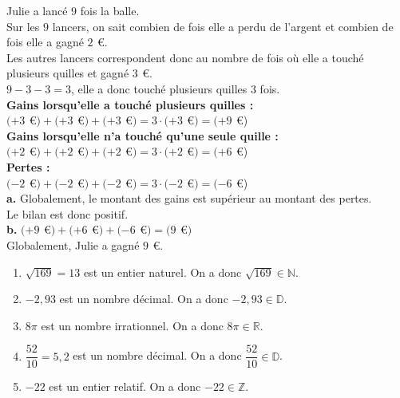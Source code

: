 \documentclass[a4paper,12pt]{report}
\begin{document}
\begin{Correction}
\begin{EXO}{}{}
 
Julie a lancé $9$ fois la balle.\\
Sur les $9$ lancers, on sait combien de fois elle a perdu de l'argent et combien de fois elle a gagné $2~$\,\euro{}.\\
Les autres lancers correspondent donc au nombre de fois où elle a touché plusieurs quilles et gagné $3~$\,\euro{}.\\
$9-3-3 = 3$,
elle a donc touché plusieurs quilles $3$ fois.\\
\textbf{Gains lorsqu'elle a touché plusieurs quilles :}\\
$(+3~$\,\euro{}$)+(+3~$\,\euro{}$)+(+3~$\,\euro{}$) = 3\cdot (+3~$\,\euro{}$) = (+9~$\,\euro{})\\
\textbf{Gains lorsqu'elle n'a touché qu'une seule quille :}\\
$(+2~$\,\euro{}$)+(+2~$\,\euro{}$)+(+2~$\,\euro{}$) = 3\cdot (+2~$\,\euro{}$) = (+6~$\,\euro{})\\
\textbf{Pertes :}\\
$(-2~$\,\euro{}$)+(-2~$\,\euro{}$)+(-2~$\,\euro{}$) = 3\cdot (-2~$\,\euro{}$) = (-6~$\,\euro{})\\
\textbf {a.}  Globalement, le montant des gains est supérieur au montant des pertes.\\ 
{\color[HTML]{f15929}Le bilan est donc positif.}\\
\textbf {b.} 
$(+9~$\,\euro{}$)+(+6~$\,\euro{}$)+(-6~$\,\euro{}$) = (9~$\,\euro{}$)$\\
{\color[HTML]{f15929}Globalement, Julie a gagné $9~$\,\euro{}.}

\end{EXO}

\begin{EXO}{}{}
\begin{multicols}{2}

\begin{enumerate}[]
\item \begin{minipage}[t]{\linewidth}$\sqrt{169}=13$  est un entier naturel. On a donc $\sqrt{169}\in \mathbb{N}$.\end{minipage}
\item \begin{minipage}[t]{\linewidth}$-2{,}93$ est un nombre décimal. On a donc $-2{,}93\in \mathbb{D}$.\end{minipage}
\item \begin{minipage}[t]{\linewidth}$8\pi$ est un nombre irrationnel. On a donc $8\pi \in \mathbb{R}$.\end{minipage}
\item \begin{minipage}[t]{\linewidth}$\dfrac{52}{10}=5{,}2$  est un nombre décimal. On a donc $\dfrac{52}{10}\in \mathbb{D}$.\end{minipage}
\item \begin{minipage}[t]{\linewidth}$-22$ est un entier relatif. On a donc $-22\in \mathbb{Z}$.\end{minipage}
\end{enumerate}
\end{multicols}


\end{EXO}
\end{Correction}
\end{document}
